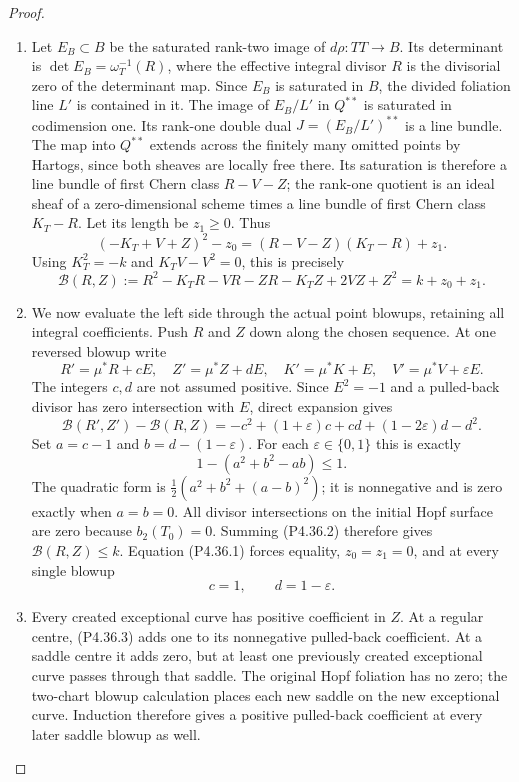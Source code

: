 \begin{proof}
\begin{enumerate}[label={$\langle1\rangle$\arabic*.},leftmargin=*]
\item Let $E_B\subset B$ be the saturated rank-two image
of $d\rho:TT\to B$. Its determinant is
$\det E_B=\omega_T^{-1}(R)$, where the effective
integral divisor $R$ is the divisorial zero of the
determinant map. Since $E_B$ is saturated in $B$,
the divided foliation line $L'$ is contained in it.
The image of $E_B/L'$ in $Q^{**}$ is saturated in
codimension one. Its rank-one double dual
$J=(E_B/L')^{**}$ is a line bundle. The map into
$Q^{**}$ extends across the finitely many omitted
points by Hartogs, since both sheaves are locally
free there. Its saturation is therefore a line bundle
of first Chern class $R-V-Z$; the rank-one quotient
is an ideal sheaf of a zero-dimensional scheme
times a line bundle of first Chern class $K_T-R$.
Let its length be $z_1\ge0$. Thus
\[
 (-K_T+V+Z)^2-z_0
       =(R-V-Z)(K_T-R)+z_1.
\]
Using $K_T^2=-k$ and $K_TV-V^2=0$, this is precisely
\[
 \mathcal B(R,Z)
 :=R^2-K_TR-VR-ZR-K_TZ+2VZ+Z^2
 =k+z_0+z_1.                                      \tag{P4.36.1}
\]

\item We now evaluate the left side through the actual
point blowups, retaining all integral coefficients.
Push $R$ and $Z$ down along the chosen sequence.
At one reversed blowup write
\[
 R'=\mu^*R+cE,\quad Z'=\mu^*Z+dE,
 \quad K'=\mu^*K+E,\quad V'=\mu^*V+\varepsilon E.
\]
The integers $c,d$ are not assumed positive.
Since $E^2=-1$ and a pulled-back divisor has zero
intersection with $E$, direct expansion gives
\[
 \mathcal B(R',Z')-\mathcal B(R,Z)
 =-c^2+(1+\varepsilon)c+cd+(1-2\varepsilon)d-d^2.
\]
Set $a=c-1$ and $b=d-(1-\varepsilon)$. For each
$\varepsilon\in\{0,1\}$ this is exactly
\[
 1-(a^2+b^2-ab)\le1.                            \tag{P4.36.2}
\]
The quadratic form is
$\frac12(a^2+b^2+(a-b)^2)$; it is nonnegative
and is zero exactly when $a=b=0$.
All divisor intersections on the initial Hopf
surface are zero because $b_2(T_0)=0$.
Summing (P4.36.2) therefore gives
$\mathcal B(R,Z)\le k$.
Equation (P4.36.1) forces equality, $z_0=z_1=0$,
and at every single blowup
\[
 c=1,\qquad d=1-\varepsilon.                    \tag{P4.36.3}
\]

\item Every created exceptional curve has positive
coefficient in $Z$. At a regular centre, (P4.36.3)
adds one to its nonnegative pulled-back coefficient.
At a saddle centre it adds zero, but at least one
previously created exceptional curve passes through
that saddle. The original Hopf foliation has no
zero; the two-chart blowup calculation places each
new saddle on the new exceptional curve. Induction
therefore gives a positive pulled-back coefficient
at every later saddle blowup as well.


\end{enumerate}
\end{proof}
